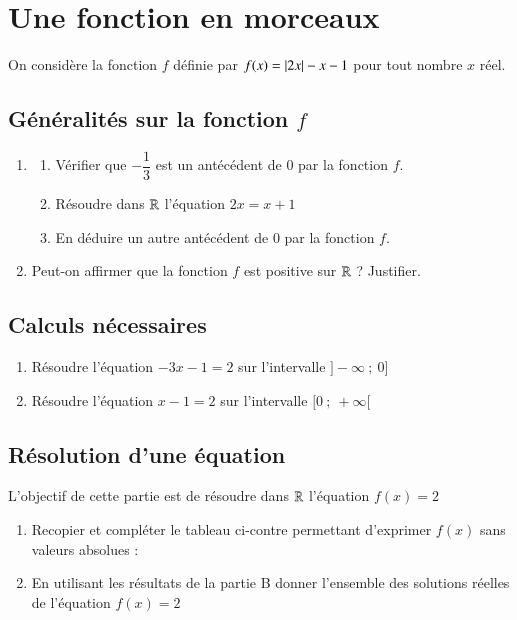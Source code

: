 \documentclass[oneside,12pt]{exam}          %
\begin{document}
\section{Une fonction en morceaux}
On considère la fonction $f$ définie par $f(x) = {\left\lvert 2x \right\rvert} - x - 1$ pour tout nombre $x$ réel.

\subsection{Généralités sur la fonction $f$}
\begin{enumerate}
	\item \begin{enumerate}
		\item Vérifier que $-\dfrac{1}{3}$ est un antécédent de $0$ par la fonction $f$.
		\item Résoudre dans ${\mathbb R}$ l'équation $2x = x+1$
		\item En déduire un autre antécédent de $0$ par la fonction $f$.
	\end{enumerate}
	\item Peut-on affirmer que la fonction $f$ est positive sur ${\mathbb R}$ ? Justifier.
\end{enumerate}


\subsection{Calculs nécessaires}
\begin{enumerate}
	\item Résoudre l'équation $-3x - 1 = 2$ sur l'intervalle $]-\infty ~;~ 0]$
	\item Résoudre l'équation $x - 1 = 2$ sur l'intervalle $[0 ~;~ +\infty[$
\end{enumerate}


\subsection{Résolution d'une équation}
L'objectif de cette partie est de résoudre dans ${\mathbb R}$ l'équation $f(x) = 2$
\begin{enumerate}
	\item Recopier et compléter le tableau ci-contre permettant d'exprimer $f(x)$ sans valeurs absolues :
	\begin{center}
	\end{center}
	
	\item En utilisant les résultats de la partie B donner l'ensemble des solutions réelles de l'équation $f(x) = 2$
\end{enumerate}
\end{document}
